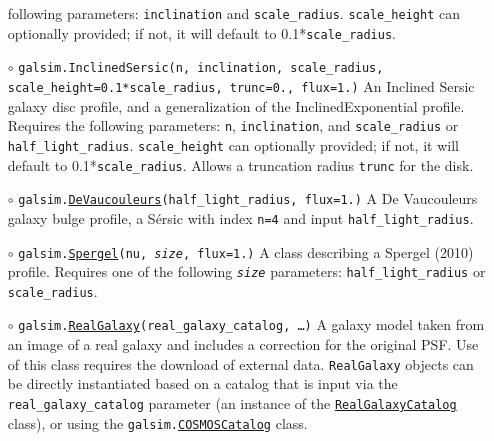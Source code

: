 \documentclass[preprint,10pt]{../../devel/modules/aastex}
\begin{document}
\begin{itemize}
    following parameters: \texttt{inclination} and \texttt{scale\_radius}.
    \texttt{scale\_height} can optionally provided; if not, it will default to 0.1*\texttt{scale\_radius}.
\item[$\circ$]
  \texttt{galsim.}\texttt{InclinedSersic}\texttt{(n, inclination, scale\_radius, scale\_height=0.1*scale\_radius, trunc=0., flux=1.)}
    \newline
    An Inclined Sersic galaxy disc profile, and a generalization of the InclinedExponential profile. Requires the
    following parameters: \texttt{n}, \texttt{inclination}, and \texttt{scale\_radius} or \texttt{half\_light\_radius}.
    \texttt{scale\_height} can optionally provided; if not, it will default to 0.1*\texttt{scale\_radius}. Allows a truncation radius
    \texttt{trunc} for the disk.
\item[$\circ$]
  \texttt{galsim.}\href{http://galsim-developers.github.com/GalSim/classgalsim_1_1base_1_1_de_vaucouleurs.html}{\texttt{DeVaucouleurs}}\texttt{(half\_light\_radius, flux=1.)}
    \newline
    A De Vaucouleurs galaxy bulge profile, a S\'{e}rsic
    with index \texttt{n=4} and input \texttt{half\_light\_radius}.
\item[$\circ$]
  \texttt{galsim.}\href{http://galsim-developers.github.io/GalSim/classgalsim_1_1base_1_1_spergel.html}{\texttt{Spergel}}\texttt{(nu, \emph{size}, flux=1.)}
    \newline
    A class describing a Spergel (2010) profile.   Requires one of the
    following \texttt{\emph{size}} parameters: \texttt{half\_light\_radius} or \texttt{scale\_radius}.
\item[$\circ$]
  \texttt{galsim.}\href{http://galsim-developers.github.io/GalSim/classgalsim_1_1real_1_1_real_galaxy.html}{\texttt{RealGalaxy}}\texttt{(real\_galaxy\_catalog, \dots)}
    \newline
    A galaxy model taken from an image of a real galaxy and includes
    a correction for the original PSF.   Use of this class requires the
    download of external data.  \texttt{RealGalaxy} objects can be directly instantiated based on a catalog that
    is input via the
    \texttt{real\_galaxy\_catalog} parameter (an instance of the
    \href{http://galsim-developers.github.com/GalSim/classgalsim_1_1real_1_1_real_galaxy_catalog.html}{\texttt{RealGalaxyCatalog}}
    class), or using the \texttt{galsim.\href{http://galsim-developers.github.io/GalSim/classgalsim_1_1scene_1_1_c_o_s_m_o_s_catalog.html}{COSMOSCatalog}} class.


\end{itemize}
\end{document}
